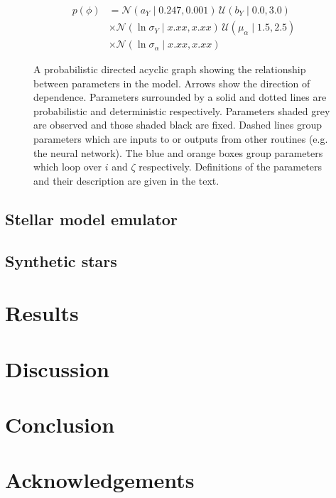 \documentclass[fleqn,usenatbib]{mnras}
\newcommand{\normal}{\mathcal{N}}
\newcommand{\uniform}{\mathcal{U}}
\begin{document}
\begin{equation}
    \begin{split}
        p(\phi) &= \normal(a_Y \mid 0.247, 0.001) \, \uniform(b_Y \mid 0.0, 3.0) \\
        &\times \normal(\ln \sigma_Y \mid x.xx, x.xx) \, \uniform(\mu_\alpha \mid 1.5, 2.5) \\
        &\times \normal(\ln \sigma_\alpha \mid x.xx, x.xx)
    \end{split}
\end{equation}

\begin{figure}
    \centering
    
    \caption{A probabilistic directed acyclic graph showing the relationship between parameters in the model. Arrows show the direction of dependence. Parameters surrounded by a solid and dotted lines are probabilistic and deterministic respectively. Parameters shaded grey are observed and those shaded black are fixed. Dashed lines group parameters which are inputs to or outputs from other routines (e.g. the neural network). The blue and orange boxes group parameters which loop over \(i\) and \(\zeta\) respectively. Definitions of the parameters and their description are given in the text.}
\end{figure}

\subsection{Stellar model emulator}
\label{sec:emulator}

\subsection{Synthetic stars}
\label{sec:synth}

\section{Results}
\label{sec:results}

\section{Discussion}
\label{sec:discussion}

\section{Conclusion}
\label{sec:conclusion}

\section*{Acknowledgements}
\end{document}
